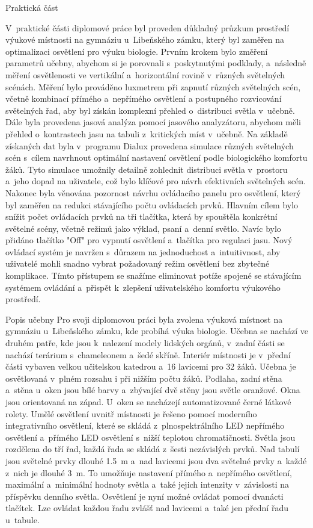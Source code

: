 \chap Praktická část

V~praktické části diplomové práce byl proveden důkladný průzkum prostředí výukové místnosti na gymnáziu u~Libeňského zámku,
který byl zaměřen na optimalizaci osvětlení pro výuku biologie.
Prvním krokem bylo změření parametrů učebny, abychom si je porovnali s~poskytnutými podklady, a~následně měření
osvětlenosti ve vertikální a~horizontální rovině v~různých světelných scénách.
Měření bylo prováděno luxmetrem při zapnutí různých světelných scén, včetně kombinací přímého a~nepřímého osvětlení
a postupného rozvicování světelných řad,
 aby byl získán komplexní přehled o~distribuci světla v~učebně.
\medskip
Dále byla provedena jasová analýza pomocí jasového analyzátoru, abychom měli přehled o~kontrastech jasu na tabuli
z~kritických míst v~učebně.
\medskip
Na základě získaných dat byla v~programu Dialux provedena simulace různých světelných scén s~cílem navrhnout optimální
nastavení osvětlení podle biologického komfortu žáků.
Tyto simulace umožnily detailně zohlednit distribuci světla v~prostoru a~jeho dopad na uživatele, což bylo
klíčové pro návrh efektivních světelných scén.
\medskip
Nakonec byla věnována pozornost návrhu ovládacího panelu pro osvětlení, který byl zaměřen na redukci stávajícího
počtu ovládacích prvků.
\medskip
Hlavním cílem bylo snížit počet ovládacích prvků na tři tlačítka, která by spouštěla konkrétní světelné scény,
včetně režimů jako výklad, psaní a~denní světlo. Navíc bylo přidáno tlačítko "Off" pro vypnutí osvětlení a~tlačítka pro regulaci jasu.
\medskip
Nový ovládací systém je navržen s~důrazem na jednoduchost a~intuitivnost, aby uživatelé mohli snadno vybrat
požadovaný režim osvětlení bez zbytečné komplikace. Tímto přístupem se snažíme eliminovat potíže spojené
se stávajícím systémem ovládání a~přispět k~zlepšení uživatelského komfortu výukového prostředí.

\sec Popis učebny
Pro svoji diplomovou práci byla zvolena výuková místnost na gymnáziu u~Libeňského zámku, kde probíhá výuka
biologie. Učebna se nachází ve druhém patře, kde jsou k~nalezení modely lidských orgánů, v~zadní části se nachází
terárium s~chameleonem a~šedé skříně. Interiér místnosti je v~přední části vybaven velkou učitelskou katedrou
a~16 lavicemi pro 32 žáků. Učebna je osvětlovaná v~plném rozsahu i při nižším počtu žáků. Podlaha, zadní stěna
a~stěna u~oken jsou bílé barvy a~zbývající dvě stěny jsou světle oranžové. Okna jsou orientovaná na západ.
U~oken se nacházejí automatizované černé látkové rolety.
\medskip
Umělé osvětlení uvnitř místnosti je řešeno pomocí moderního integrativního osvětlení, které se skládá
z~plnospektrálního LED nepřímého osvětlení a~přímého LED osvětlení s~nižší teplotou chromatičnosti.
Světla jsou rozdělena do tří řad, každá řada se skládá z~šesti nezávislých prvků.
Nad tabulí jsou světelné prvky dlouhé 1.5~m a~nad lavicemi jsou dva světelné prvky a~každé z~nich je dlouhé 3~m.
To umožňuje nastavení přímého a~nepřímého osvětlení, maximální a~minimální hodnoty světla
a~také jejich intenzity v~závislosti na příspěvku denního světla.
Osvětlení je nyní možné ovládat pomocí dvanácti tlačítek. Lze ovládat každou řadu zvlášť nad lavicemi
a~také jen přední řadu u~tabule.


